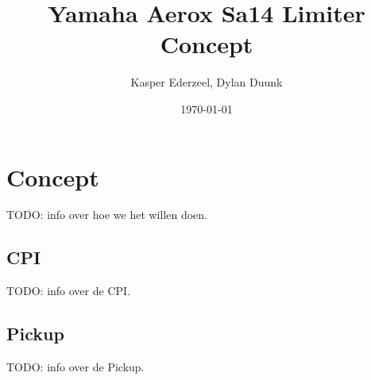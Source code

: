 \documentclass[a4paper]{article}
\begin{document}
\title{Yamaha Aerox Sa14 Limiter Concept}
\author{Kasper Ederzeel, Dylan Duunk}
\date{\today}
\maketitle

\newpage
\tableofcontents
\newpage
{}

\section{Concept}
TODO: info over hoe we het willen doen.
\subsection{CPI}
TODO: info over de CPI.
\subsection{Pickup}
TODO: info over de Pickup.
\end{document}
